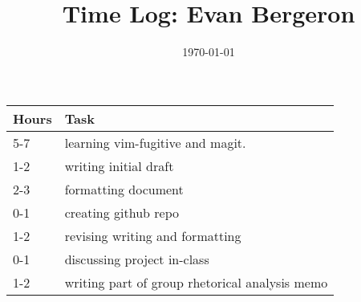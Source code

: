 \documentclass{article}
\title{Time Log: Evan Bergeron}
\date{\today}
\begin{document}
\maketitle

\begin{table}[h]
\centering
\label{my-label}
\begin{tabular}{ll}
\textbf{Hours} & \textbf{Task}            \\ \hline
5-7&learning vim-fugitive and magit.\\
1-2&writing initial draft\\
2-3&formatting document\\
0-1&creating github repo\\
1-2&revising writing and formatting\\
0-1&discussing project in-class\\
1-2&writing part of group rhetorical analysis memo\\
\end{tabular}
\end{table}
\end{document}
